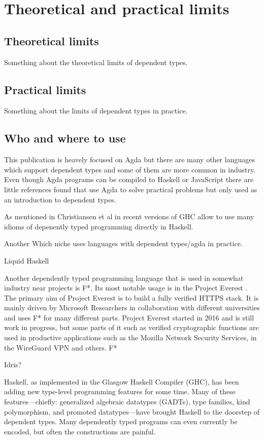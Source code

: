 \section{Theoretical and practical limits}
\subsection{Theoretical limits}
Something about the theoretical limits of dependent types.
\subsection{Practical limits}
Something about the limits of dependent types in practice.
\subsection{Who and where to use}
This publication is heavely focused on Agda but there are many other languages which support dependent types and some of them are more common in industry.
Even though Agda programs can be compiled to Haskell or JavaScript there are little references found that use Agda to solve practical problems but only used as an introduction to dependent types.

As mentioned in Christiansen et al in \cite{10.1145/3341704} recent versions of GHC allow to use many idioms of depenently typed programming directly in Haskell.

Another 
Which niche uses languages with dependent types/agda in practice.

Liquid Haskell \cite{DBLP:journals/corr/abs-1711-03842, 10.1145/3299711.3242756}

Another dependently typed programming language that is used in somewhat industry near projects is F*. 
Its most notable usage is in the Project Everest \cite{project_everest_github_io}. The primary aim of Project Everest is to build a fully verified HTTPS stack.
It is mainly driven by Microsoft Researchers in collaboration with different universities and uses F* for many different parts.
Project Everest started in 2016 and is still work in progress, but some parts of it such as verified cryptographic functions are used in productive applications such as the Mozilla Network Security Services\cite{project_everest_slides},  in the WireGuard VPN and others. 
F* 

Idris?

Haskell, as implemented in the Glasgow Haskell Compiler (GHC), has been adding new type-level programming features for some time. Many of these features---chiefly: generalized algebraic datatypes (GADTs), type families, kind polymorphism, and promoted datatypes---have brought Haskell to the doorstep of dependent types. Many dependently typed programs can even currently be encoded, but often the constructions are painful. \cite{DBLP:journals/corr/Eisenberg16}

